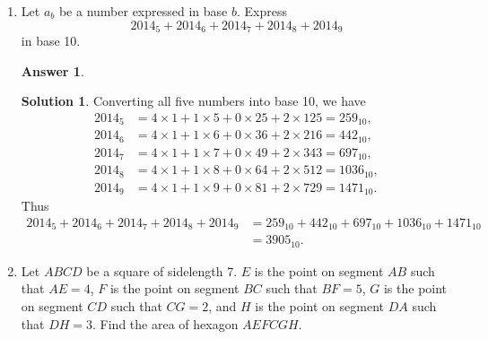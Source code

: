 \documentclass[11pt]{article}
\theoremstyle{definition}
\newtheorem*{solution}{Solution}
\newtheorem*{answer}{Answer}
\newcommand{\fdbox}[2]{\fbox{\sffamily\LARGE\vphantom y#1: \bfseries #2} \par\vspace{1em}} %
\begin{document}
\newcommand{\logo}{%
\begin{minipage}[b]{22em}
\centering\noindent
\\[0.5em]
\begin{minipage}[t][4em][t]{12em} \centering
{\huge \bfseries ${\bf 26^{\text{th}}}$ TJIMO } \\
\textsc{\large Alexandria, Virginia}
\end{minipage}
\end{minipage}
\vspace*{-0.05em}
}
\newcommand{\sevenpoints}{}
\newcommand{\righthead}{\fdbox{Round}{Team Solutions}}

\begin{enumerate}


\item Let $a_b$ be a number expressed in base $b$. Express\[2014_{5}+2014_{6}+2014_{7}+2014_{8}+2014_{9}\]in base 10.


\begin{answer}
\end{answer}

\begin{solution}
Converting all five numbers into base 10, we have
\begin{align*}
2014_5 &= 4 \times 1 + 1 \times 5 + 0 \times 25 + 2 \times 125 = 259_{10}, \\ 2014_6 &= 4 \times 1 + 1 \times 6 + 0 \times 36 + 2 \times 216 = 442_{10}, \\ 2014_7 &= 4 \times 1 + 1 \times 7 + 0 \times 49 + 2 \times 343 = 697_{10}, \\ 2014_8 &= 4 \times 1 + 1 \times 8 + 0 \times 64 + 2 \times 512 = 1036_{10}, \\ 2014_9 &= 4 \times 1 + 1 \times 9 + 0 \times 81 + 2 \times 729 = 1471_{10}.
\end{align*}
Thus\begin{align*}2014_5 + 2014_6 + 2014_7 + 2014_8 + 2014_9 &= 259_{10} + 442_{10} + 697_{10} + 1036_{10} + 1471_{10} \\&= 3905_{10}.\end{align*}
\end{solution}

\item Let $ABCD$ be a square of sidelength 7. $E$ is the point on segment $AB$ such that $AE = 4$, $F$ is the point on segment $BC$ such that $BF = 5$, $G$ is the point on segment $CD$ such that $CG = 2$, and $H$ is the point on segment $DA$ such that $DH = 3$. Find the area of hexagon $AEFCGH$.


\end{enumerate}
\end{document}
